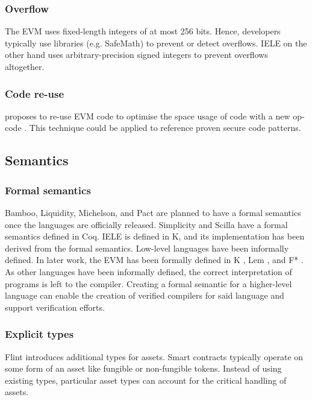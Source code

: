 \subsubsection{Overflow}
The EVM uses fixed-length integers of at most 256 bits.
Hence, developers typically use libraries (e.g. SafeMath) to prevent or detect overflows.
IELE on the other hand uses arbitrary-precision signed integers to prevent overflows altogether.



\subsubsection{Code re-use}
\citeauthor{Pontiveros2018} proposes to re-use EVM code to optimise the space usage of code with a new op-code \cite{Pontiveros2018}. This technique could be applied to reference proven secure code patterns.

\subsection{Semantics}

\subsubsection{Formal semantics}
Bamboo, Liquidity, Michelson, and Pact are planned to have a formal semantics once the languages are officially released.  Simplicity and Scilla have a formal semantics defined in Coq. IELE is defined in K, and its implementation has been derived from the formal semantics.
Low-level languages have been informally defined. In later work, the EVM has been formally defined in K \cite{Hildenbrandt2017}, Lem \cite{Hirai2017}, and F* \cite{Grishchenko2018}.
As other languages have been informally defined, the correct interpretation of programs is left to the compiler. Creating a formal semantic for a higher-level language can enable the creation of verified compilers for said language and support verification efforts.

\subsubsection{Explicit types}
Flint introduces additional types for assets. Smart contracts typically operate on some form of an asset like fungible or non-fungible tokens. Instead of using existing types, particular asset types can account for the critical handling of assets.

